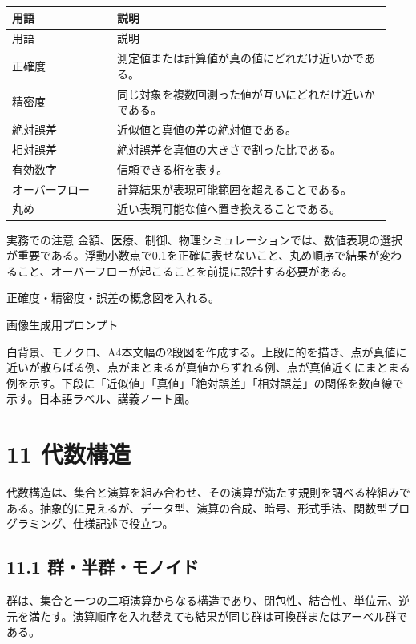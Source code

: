 \documentclass[uplatex,dvipdfmx,a4paper,10pt]{jsarticle}
\begin{document}
\begin{longtable}{>{\raggedright\arraybackslash}p{0.26\linewidth} >{\raggedright\arraybackslash}p{0.68\linewidth}}
\toprule
用語 & 説明 \\
\midrule
\endfirsthead
\toprule
用語 & 説明 \\
\midrule
\endhead
正確度 & 測定値または計算値が真の値にどれだけ近いかである。 \\
精密度 & 同じ対象を複数回測った値が互いにどれだけ近いかである。 \\
絶対誤差 & 近似値と真値の差の絶対値である。 \\
相対誤差 & 絶対誤差を真値の大きさで割った比である。 \\
有効数字 & 信頼できる桁を表す。 \\
オーバーフロー & 計算結果が表現可能範囲を超えることである。 \\
丸め & 近い表現可能な値へ置き換えることである。 \\
\bottomrule
\end{longtable}
\begin{infobox}{実務での注意}
金額、医療、制御、物理シミュレーションでは、数値表現の選択が重要である。浮動小数点で0.1を正確に表せないこと、丸め順序で結果が変わること、オーバーフローが起こることを前提に設計する必要がある。
\end{infobox}
\begin{todobox}
正確度・精密度・誤差の概念図を入れる。

画像生成用プロンプト

白背景、モノクロ、A4本文幅の2段図を作成する。上段に的を描き、点が真値に近いが散らばる例、点がまとまるが真値からずれる例、点が真値近くにまとまる例を示す。下段に「近似値」「真値」「絶対誤差」「相対誤差」の関係を数直線で示す。日本語ラベル、講義ノート風。
\end{todobox}
\section{11 代数構造}
代数構造は、集合と演算を組み合わせ、その演算が満たす規則を調べる枠組みである。抽象的に見えるが、データ型、演算の合成、暗号、形式手法、関数型プログラミング、仕様記述で役立つ。

\subsection{11.1 群・半群・モノイド}
群は、集合と一つの二項演算からなる構造であり、閉包性、結合性、単位元、逆元を満たす。演算順序を入れ替えても結果が同じ群は可換群またはアーベル群である。
\end{document}
